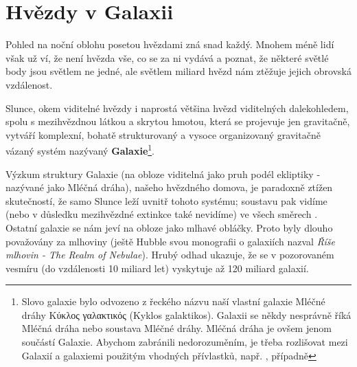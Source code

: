 \graphicspath{{../src/FYZ/img/}}
\setchaptertoc
\chapter{Hvězdy v Galaxii}\label{kulIchII}
  Pohled na noční oblohu posetou hvězdami zná snad každý. Mnohem méně lidí však už ví, že není
  hvězda vše, co se za ni vydává a poznat, že některé světlé body jsou světlem ne jedné, ale světlem
  miliard hvězd nám ztěžuje jejich obrovská vzdálenost.

  Slunce, okem viditelné hvězdy i naprostá většina hvězd viditelných dalekohledem, spolu s
  mezihvězdnou látkou a skrytou hmotou, která se projevuje jen gravitačně, vytváří komplexní, bohatě
  strukturovaný a vysoce organizovaný gravitačně vázaný systém nazývaný
  \textbf{Galaxie}\footnote{Slovo galaxie bylo odvozeno z řeckého názvu naší vlastní galaxie Mléčné
  dráhy \foreignlanguage{greek}{Κύκλος γαλακτικός} (Κyklos galaktikos). Galaxii se
  někdy nesprávně říká Mléčná dráha nebo soustava Mléčné dráhy. Mléčná dráha je ovšem jenom součástí
  Galaxie. Abychom zabránili nedorozuměním, je třeba rozlišovat mezi Galaxií a galaxiemi použitým
  vhodných přívlastků, např. ,  případně }. 

  Výzkum struktury Galaxie (na obloze viditelná jako pruh podél ekliptiky - nazývané jako Mléčná
  dráha), našeho hvězdného domova, je paradoxně ztížen skutečností, že samo Slunce leží uvnitř
  tohoto systému; soustavu pak vidíme (nebo v důsledku mezihvězdné extinkce také nevidíme) ve všech
  směrech \cite[s.~268]{Mikulasek2000}. Ostatní galaxie se nám jeví na obloze jako mlhavé obláčky.
  Proto byly dlouho považovány za mlhoviny (ještě Hubble svou monografii o galaxiích nazval
  \emph{Říše mlhovin - The Realm of Nebulae}). Hrubý odhad ukazuje, že se v pozorovaném vesmíru (do
  vzdálenosti 10 miliard let) vyskytuje až 120 miliard galaxií.


